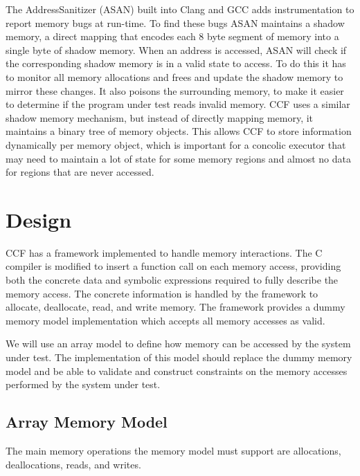 \documentclass[12pt,twoside]{report}
\begin{document}
The AddressSanitizer \cite{180957} (ASAN) built into Clang and GCC adds instrumentation to report memory bugs at run-time. To find these bugs ASAN maintains a shadow memory, a direct mapping that encodes each 8 byte segment of memory into a single byte of shadow memory. When an address is accessed, ASAN will check if the corresponding shadow memory is in a valid state to access. To do this it has to monitor all memory allocations and frees and update the shadow memory to mirror these changes. It also poisons the surrounding memory, to make it easier to determine if the program under test reads invalid memory. CCF uses a similar shadow memory mechanism, but instead of directly mapping memory, it maintains a binary tree of memory objects. This allows CCF to store information dynamically per memory object, which is important for a concolic executor that may need to maintain a lot of state for some memory regions and almost no data for regions that are never accessed.

\chapter{Design}

CCF has a framework implemented to handle memory interactions. The C compiler is modified to insert a function call on each memory access, providing both the concrete data and symbolic expressions required to fully describe the memory access. The concrete information is handled by the framework to allocate, deallocate, read, and write memory. The framework provides a dummy memory model implementation which accepts all memory accesses as valid.

We will use an array model to define how memory can be accessed by the system under test. The implementation of this model should replace the dummy memory model and be able to validate and construct constraints on the memory accesses performed by the system under test.

\section{Array Memory Model}
The main memory operations the memory model must support are allocations, deallocations, reads, and writes.
\end{document}
